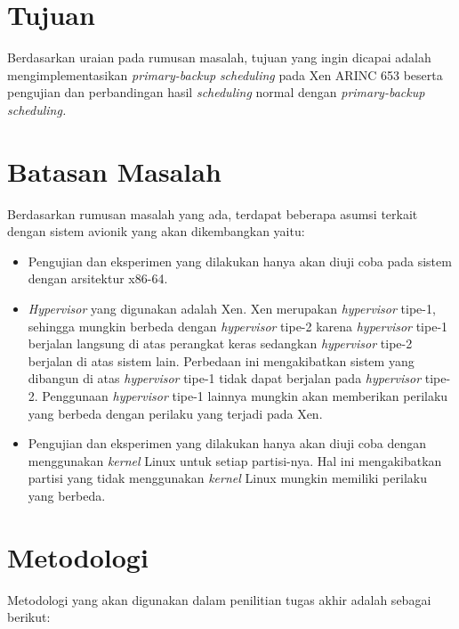 \section{Tujuan}

Berdasarkan uraian pada rumusan masalah, tujuan yang ingin dicapai adalah mengimplementasikan \textit{primary-backup} \textit{scheduling} pada Xen ARINC 653 beserta pengujian dan perbandingan hasil \textit{scheduling} normal dengan \textit{primary-backup scheduling.}


\section{Batasan Masalah}
\label{section:batasan_masalah}

Berdasarkan rumusan masalah yang ada, terdapat beberapa asumsi terkait dengan sistem avionik yang akan dikembangkan yaitu:

\begin{itemize}

    \item Pengujian dan eksperimen yang dilakukan hanya akan diuji coba pada sistem dengan arsitektur x86-64.
    \item \textit{Hypervisor} yang digunakan adalah Xen.
        Xen merupakan \textit{hypervisor} tipe-1, sehingga mungkin berbeda dengan \textit{hypervisor} tipe-2 karena \textit{hypervisor} tipe-1 berjalan langsung di atas perangkat keras sedangkan \textit{hypervisor} tipe-2 berjalan di atas sistem lain.
        Perbedaan ini mengakibatkan sistem yang dibangun di atas \textit{hypervisor} tipe-1 tidak dapat berjalan pada \textit{hypervisor} tipe-2.
        Penggunaan \textit{hypervisor} tipe-1 lainnya mungkin akan memberikan perilaku yang berbeda dengan perilaku yang terjadi pada Xen.
    \item Pengujian dan eksperimen yang dilakukan hanya akan diuji coba dengan menggunakan \textit{kernel} Linux untuk setiap partisi-nya.
        Hal ini mengakibatkan partisi yang tidak menggunakan \textit{kernel} Linux mungkin memiliki perilaku yang berbeda.

\end{itemize}

\section{Metodologi}

Metodologi yang akan digunakan dalam penilitian tugas akhir adalah sebagai berikut:

